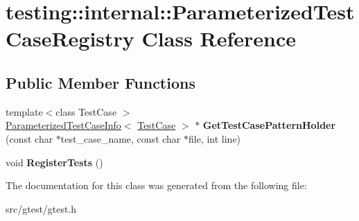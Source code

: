 \hypertarget{classtesting_1_1internal_1_1_parameterized_test_case_registry}{}\section{testing\+:\+:internal\+:\+:Parameterized\+Test\+Case\+Registry Class Reference}
\label{classtesting_1_1internal_1_1_parameterized_test_case_registry}
\subsection*{Public Member Functions}
\begin{DoxyCompactItemize}
\item 
\mbox{\label{classtesting_1_1internal_1_1_parameterized_test_case_registry_af81b3fffa8c9a26256417b85aceb9e80}} 
{\footnotesize template$<$class Test\+Case $>$ }\\\mbox{\hyperlink{classtesting_1_1internal_1_1_parameterized_test_case_info}{Parameterized\+Test\+Case\+Info}}$<$ \mbox{\hyperlink{classtesting_1_1_test_case}{Test\+Case}} $>$ $\ast$ {\bfseries Get\+Test\+Case\+Pattern\+Holder} (const char $\ast$test\+\_\+case\+\_\+name, const char $\ast$file, int line)
\item 
\mbox{\label{classtesting_1_1internal_1_1_parameterized_test_case_registry_ad5b63c8fe94f3d51d039a76c001c9223}} 
void {\bfseries Register\+Tests} ()
\end{DoxyCompactItemize}


The documentation for this class was generated from the following file\+:\begin{DoxyCompactItemize}
\item 
src/gtest/gtest.\+h\end{DoxyCompactItemize}
